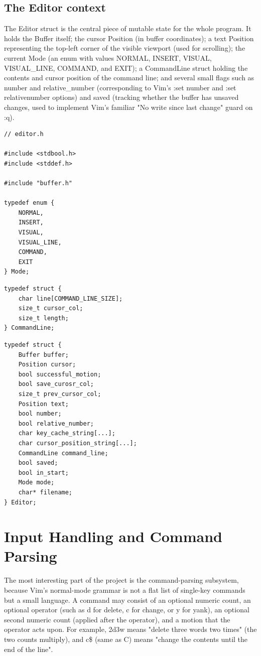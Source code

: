 \documentclass[journal]{IEEEtran}
\begin{document}
\subsection{The Editor context}
The Editor struct is the central piece of mutable state for the whole program. It holds the Buffer itself; the cursor Position (in buffer coordinates); a text Position representing the top-left corner of the visible viewport (used for scrolling); the current Mode (an enum with values NORMAL, INSERT, VISUAL, VISUAL\_LINE, COMMAND, and EXIT); a CommandLine struct holding the contents and cursor position of the command line; and several small flags such as number and relative\_number (corresponding to Vim's :set number and :set relativenumber options) and saved (tracking whether the buffer has unsaved changes, used to implement Vim's familiar "No write since last change" guard on :q).

\begin{verbatim}
// editor.h

#include <stdbool.h>
#include <stddef.h>

#include "buffer.h"

typedef enum {
    NORMAL,
    INSERT,
    VISUAL,
    VISUAL_LINE,
    COMMAND,
    EXIT
} Mode;
\end{verbatim}

\begin{verbatim}
typedef struct {
    char line[COMMAND_LINE_SIZE];
    size_t cursor_col;
    size_t length;
} CommandLine;
\end{verbatim}

\begin{verbatim}
typedef struct {
    Buffer buffer;
    Position cursor;
    bool successful_motion;
    bool save_curosr_col;
    size_t prev_cursor_col;
    Position text;
    bool number;
    bool relative_number;
    char key_cache_string[...];
    char cursor_position_string[...];
    CommandLine command_line;
    bool saved;
    bool in_start;
    Mode mode;
    char* filename;
} Editor;
\end{verbatim}

\section{Input Handling and Command Parsing}
The most interesting part of the project is the command-parsing subsystem, because Vim's normal-mode grammar is not a flat list of single-key commands but a small language. A command may consist of an optional numeric count, an optional operator (such as d for delete, c for change, or y for yank), an optional second numeric count (applied after the operator), and a motion that the operator acts upon. For example, 2d3w means "delete three words two times" (the two counts multiply), and c\$ (same as C) means "change the contents until the end of the line".
\end{document}
